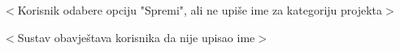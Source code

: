 \begin{packed_item}
\begin{packed_item}
\begin{packed_enum}
							\end{packed_enum}

							\item[5.b] $<$Korisnik odabere opciju "Spremi", ali ne upiše ime za kategoriju projekta$>$
							\item[] \begin{packed_enum}

								\item $<$Sustav obavještava korisnika da nije upisao ime$>$

							\end{packed_enum}

						\end{packed_item}
					\end{packed_item}

					\noindent {}
